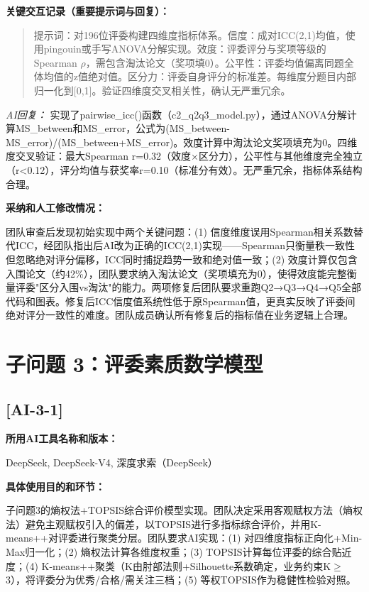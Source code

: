 \documentclass[12pt,a4paper]{ctexart}
\begin{document}
\textbf{关键交互记录（重要提示词与回复）：}\par

\begin{quote}
提示词：对196位评委构建四维度指标体系。信度：成对ICC(2,1)均值，使用pingouin或手写ANOVA分解实现。效度：评委评分与奖项等级的Spearman $\rho$，需包含淘汰论文（奖项填0）。公平性：评委均值偏离同题全体均值的z值绝对值。区分力：评委自身评分的标准差。每维度分题目内部归一化到[0,1]。验证四维度交叉相关性，确认无严重冗余。
\end{quote}

\textit{AI回复：} 实现了pairwise\_icc()函数（c2\_q2q3\_model.py），通过ANOVA分解计算MS\_between和MS\_error，公式为(MS\_between-MS\_error)/(MS\_between+MS\_error)。效度计算中淘汰论文奖项填充为0。四维度交叉验证：最大Spearman r=0.32（效度×区分力），公平性与其他维度完全独立（r<0.12），评分均值与获奖率r=0.10（标准分有效）。无严重冗余，指标体系结构合理。

\textbf{采纳和人工修改情况：}\par
团队审查后发现初始实现中两个关键问题：(1) 信度维度误用Spearman相关系数替代ICC，经团队指出后AI改为正确的ICC(2,1)实现——Spearman只衡量秩一致性但忽略绝对评分偏移，ICC同时捕捉趋势一致和绝对值一致；(2) 效度计算仅包含入围论文（约42\%），团队要求纳入淘汰论文（奖项填充为0），使得效度能完整衡量评委"区分入围vs淘汰"的能力。两项修复后团队要求重跑Q2→Q3→Q4→Q5全部代码和图表。修复后ICC信度值系统性低于原Spearman值，更真实反映了评委间绝对评分一致性的难度。团队成员确认所有修复后的指标值在业务逻辑上合理。

\section*{子问题 3：评委素质数学模型}

\subsection*{[AI-3-1]}

\textbf{所用AI工具名称和版本：}\par
DeepSeek, DeepSeek-V4, 深度求索（DeepSeek）

\textbf{具体使用目的和环节：}\par
子问题3的熵权法+TOPSIS综合评价模型实现。团队决定采用客观赋权方法（熵权法）避免主观赋权引入的偏差，以TOPSIS进行多指标综合评价，并用K-means++对评委进行聚类分层。团队要求AI实现：(1) 对四维度指标正向化+Min-Max归一化；(2) 熵权法计算各维度权重；(3) TOPSIS计算每位评委的综合贴近度；(4) K-means++聚类（K由肘部法则+Silhouette系数确定，业务约束K$\geq$3），将评委分为优秀/合格/需关注三档；(5) 等权TOPSIS作为稳健性检验对照。
\end{document}
